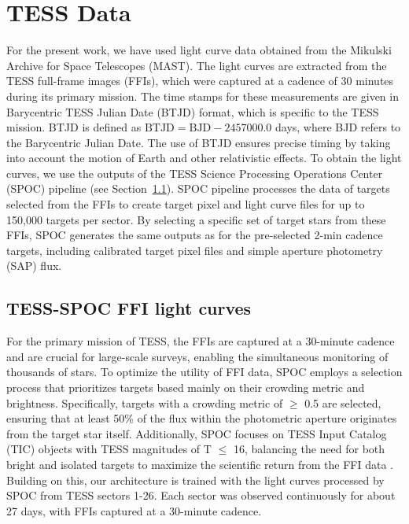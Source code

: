 \section{TESS Data}
\label{sec:dataset_tess}

For the present work, we have used light curve data obtained from the Mikulski Archive for Space Telescopes (MAST). The light curves are extracted from the TESS full-frame images (FFIs), which were captured at a cadence of 30 minutes during its primary mission. The time stamps for these measurements are given in Barycentric TESS Julian Date (BTJD) format, which is specific to the TESS mission. BTJD is defined as $\mathrm{BTJD = BJD - 2457000.0}$ days, where BJD refers to the Barycentric Julian Date. The use of BTJD ensures precise timing by taking into account the motion of Earth and other relativistic effects. To obtain the light curves, we use the outputs of the TESS Science Processing Operations Center (SPOC) pipeline \citep{caldwell2020tess} (see Section~\ref{sec:tess_spoc_ffi}). SPOC pipeline processes the data of targets selected from the FFIs to create target pixel and light curve files for up to 150,000 targets per sector. By selecting a specific set of target stars from these FFIs, SPOC generates the same outputs as for the pre-selected 2-min cadence targets, including calibrated target pixel files and simple aperture photometry (SAP) flux.  \par


\subsection{TESS-SPOC FFI light curves}
\label{sec:tess_spoc_ffi}

For the primary mission of TESS, the FFIs are captured at a 30-minute cadence and are crucial for large-scale surveys, enabling the simultaneous monitoring of thousands of stars. To optimize the utility of FFI data, SPOC employs a selection process that prioritizes targets based mainly on their crowding metric \citep{bryson2020kepler} and brightness. Specifically, targets with a crowding metric of $\geq$ 0.5 are selected, ensuring that at least 50\% of the flux within the photometric aperture originates from the target star itself. Additionally, SPOC focuses on TESS Input Catalog (TIC) objects with TESS magnitudes of T $\leq$ 16, balancing the need for both bright and isolated targets to maximize the scientific return from the FFI data \citep{caldwell2020tess}. Building on this, our architecture is trained with the light curves processed by SPOC from TESS sectors 1-26. Each sector was observed continuously for about 27 days, with FFIs captured at a 30-minute cadence. \par

